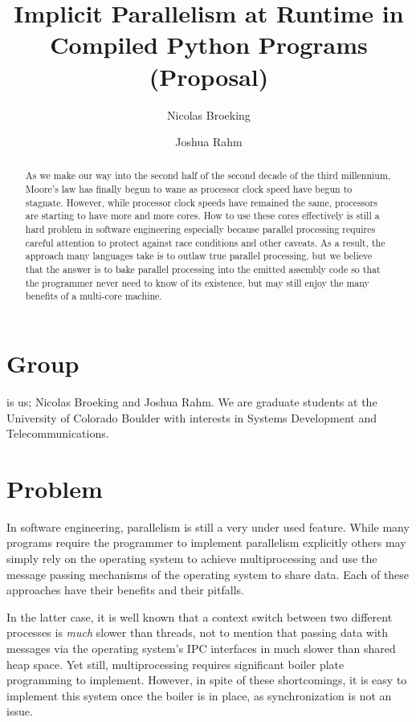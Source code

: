 \documentclass{article}
\title{Implicit Parallelism at Runtime in Compiled Python Programs\\
    (Proposal)}
\author{Nicolas Broeking \and Joshua Rahm}
\begin{document}
\begin{titlepage}
\maketitle

\end{titlepage}

\raggedcolumns
\begin{multicols}{2}
\raggedcolumns

\begin{abstract}

As we make our way into the second half of the second decade of the
third millennium, Moore's law has finally begun to wane as processor
clock speed have begun to stagnate. However, while processor clock
speeds have remained the same, processors are starting to have more and
more cores. How to use these cores effectively is still a hard problem
in software engineering especially because parallel processing requires
careful attention to protect against race conditions and other caveats.
As a result, the approach many languages take is to outlaw true parallel
processing, but we believe that the answer is to bake parallel
processing into the emitted assembly code so that the programmer never
need to know of its existence, but may still enjoy the many benefits of
a multi-core machine.

\end{abstract}

\section*{Group}
\backslashx is us; Nicolas Broeking and
Joshua Rahm. We are graduate students at the University of Colorado
Boulder with interests in Systems Development and Telecommunications.

\section*{Problem} In software engineering, parallelism is still a very
under used feature.  While many programs require the programmer to
implement parallelism explicitly others may simply rely on the operating
system to achieve multiprocessing and use the message passing mechanisms
of the operating system to share data.  Each of these approaches have
their benefits and their pitfalls.

In the latter case, it is well known that a context switch between two
different processes is \emph{much} slower than threads, not to mention
that passing data with messages via the operating system's IPC
interfaces in much slower than shared heap space. Yet still,
multiprocessing requires significant boiler plate programming to
implement. However, in spite of these shortcomings, it is easy to
implement this system once the boiler is in place, as synchronization is
not an issue.


\end{multicols}
\end{document}
